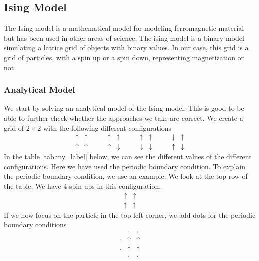 \documentclass{article}
\begin{document}
\newpage
\subsection{Ising Model}
The Ising model is a mathematical model for modeling ferromagnetic material but has been used in other areas of science. The ising model is a binary model simulating a lattice grid of objects with binary values. In our case, this grid is a grid of particles, with a spin up or a spin down, representing magnetization or not.


\subsubsection{Analytical Model} \label{anal}
We start by solving an analytical model of the Ising model. This is good to be able to further check whether the approaches we take are correct. We create a grid of $2 \times 2$ with the following different configurations
\[
\begin{matrix}
\uparrow & \uparrow \\
\uparrow & \uparrow
\end{matrix}
\qquad
\begin{matrix}
\uparrow & \uparrow \\
\uparrow & \downarrow
\end{matrix}
\qquad
\begin{matrix}
\uparrow & \uparrow \\
\downarrow & \downarrow
\end{matrix}
\qquad
\begin{matrix}
\downarrow & \uparrow \\
\uparrow & \downarrow
\end{matrix}
\]
In the table \ref{tab:my_label} below, we can see the different values of the different configurations. Here we have used the periodic boundary condition. To explain the periodic boundary condition, we use an example. We look at the top row of the table. We have 4 spin ups in this configuration.
\[
\begin{matrix}
\uparrow & \uparrow \\
\uparrow & \uparrow
\end{matrix}
\]
If we now focus on the particle in the top left corner, we add dots for the periodic boundary conditions
\[
\begin{matrix}
 & \cdot & \cdot \\
\cdot & \uparrow & \uparrow \\
\cdot & \uparrow & \uparrow  \\
 & \cdot & \cdot
\end{matrix}
\]
\end{document}
